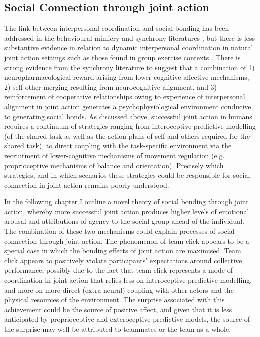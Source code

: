 \begin{CJK}{UTF8}{gbsn}
\section{Social Connection through joint action}
The link between interpersonal coordination and social bonding has been addressed in the behavioural mimicry and synchrony literatures \citep[e.g.,][]{Wheatley2012,Launay2016,Mogan2017}, but there is less substantive evidence in relation to dynamic interpersonal coordination in natural joint action settings such as those found in group exercise contexts \citep{Marsh2009,Miles2009,Lumsden2012}.  There is strong evidence from the synchrony literature to suggest that a combination of 1) neuropharmacological reward arising from lower-cognitive affective mechanisms, 2) self-other merging resulting from neurocognitive alignment, and 3) reinforcement of cooperative relationships owing to experience of interpersonal alignment in joint action generates a psychophysiological environment conducive to generating social bonds.  As discussed above, successful joint action in humans requires a continuum of strategies ranging from interoceptive predictive modelling (of the shared task as well as the action plans of self and others required for the shared task), to direct coupling with the task-specific environment via the recruitment of lower-cognitive mechanisms of movement regulation (e.g. proprioceptive mechanisms of balance and orientation).  Precisely which strategies, and in which scenarios these strategies could be responsible for social connection in joint action remains poorly understood.

In the following chapter I outline a novel theory of social bonding through joint action, whereby more successful joint action produces higher levels of emotional arousal and attributions of agency to the social group ahead of the individual. The combination of these two mechanisms could explain processes of social connection through joint action.  The phenomenon of team click appears to be a special case in which the bonding effects of joint action are maximised.  Team click appears to positively violate participants' expectations around collective performance, possibly due to the fact that team click represents a mode of coordination in joint action that relies less on interoceptive predictive modelling, and more on more direct (extra-neural) coupling with other actors and the physical resources of the environment.  The surprise associated with this achievement could be the source of positive affect, and given that it is less anticipated by proprioceptive and exteroceptive predictive models, the source of the surprise may well be attributed to teammates or the team as a whole.




\end{CJK}
